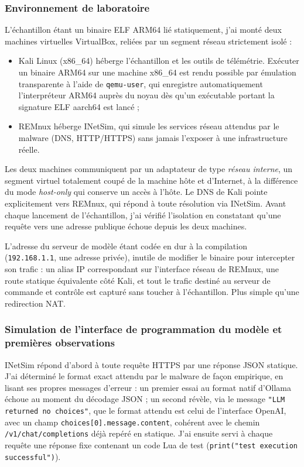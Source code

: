 \subsubsection{Environnement de laboratoire}

L'échantillon étant un binaire ELF ARM64 lié statiquement, j'ai monté deux machines virtuelles VirtualBox, reliées par un segment réseau strictement isolé :

\begin{itemize}
    \item Kali Linux (x86\_64) héberge l'échantillon et les outils de télémétrie. Exécuter un binaire ARM64 sur une machine x86\_64 est rendu possible par émulation transparente à l'aide de \texttt{qemu-user}, qui enregistre automatiquement l'interpréteur ARM64 auprès du noyau dès qu'un exécutable portant la signature ELF aarch64 est lancé ;
    \item REMnux héberge INetSim, qui simule les services réseau attendus par le malware (DNS, HTTP/HTTPS) sans jamais l'exposer à une infrastructure réelle.
\end{itemize}

Les deux machines communiquent par un adaptateur de type \emph{réseau interne}, un segment virtuel totalement coupé de la machine hôte et d'Internet, à la différence du mode \emph{host-only} qui conserve un accès à l'hôte. Le DNS de Kali pointe explicitement vers REMnux, qui répond à toute résolution via INetSim. Avant chaque lancement de l'échantillon, j'ai vérifié l'isolation en constatant qu'une requête vers une adresse publique échoue depuis les deux machines.

L'adresse du serveur de modèle étant codée en dur à la compilation (\texttt{192.168.1.1}, une adresse privée), inutile de modifier le binaire pour intercepter son trafic : un alias IP correspondant sur l'interface réseau de REMnux, une route statique équivalente côté Kali, et tout le trafic destiné au serveur de commande et contrôle est capturé sans toucher à l'échantillon. Plus simple qu'une redirection NAT.

\subsubsection{Simulation de l'interface de programmation du modèle et premières observations}

INetSim répond d'abord à toute requête HTTPS par une réponse JSON statique. J'ai déterminé le format exact attendu par le malware de façon empirique, en lisant ses propres messages d'erreur : un premier essai au format natif d'Ollama échoue au moment du décodage JSON ; un second révèle, via le message \texttt{"LLM returned no choices"}, que le format attendu est celui de l'interface OpenAI, avec un champ \texttt{choices[0].message.content}, cohérent avec le chemin \texttt{/v1/chat/completions} déjà repéré en statique. J'ai ensuite servi à chaque requête une réponse fixe contenant un code Lua de test (\texttt{print("test execution successful")}).

